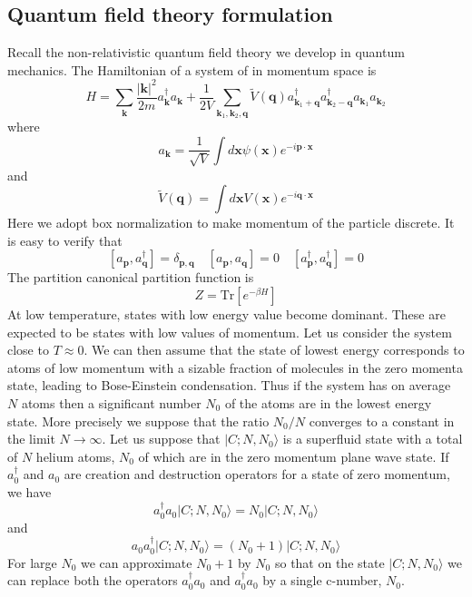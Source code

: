 \subsection{Quantum field theory formulation}
Recall the non-relativistic quantum field theory we develop in quantum mechanics.
The Hamiltonian of a system of  in momentum space is
\[H = \sum_{\bm{k}} \frac{|\bm{k}|^2}{2m} a_{\bm{k}}^{\dagger} a_{\bm{k}} + \frac{1}{2V} \sum_{\bm{k}_1,\bm{k}_2,\bm{q}} \tilde{V}(\bm{q}) a^{\dagger}_{\bm{k}_1 + \bm{q}} a^{\dagger}_{\bm{k}_2-\bm{q}} a_{\bm{k}_1} a_{\bm{k}_2}\]
where
\[a_{\bm{k}} = \frac{1}{\sqrt{V}} \int d\bm{x}\psi(\bm{x}) e^{-i\bm{p}\cdot\bm{x}}\]
and
\[\tilde{V}(\bm{q}) = \int d\bm{x} V(\bm{x}) e^{-i\bm{q}\cdot\bm{x}}\]
Here we adopt box normalization to make momentum of the particle discrete. It is easy to verify that
\[[a_{\bm{p}},a_{\bm{q}}^{\dagger}] = \delta_{\bm{p},\bm{q}} \quad [a_{\bm{p}},a_{\bm{q}}] = 0 \quad [a^{\dagger}_{\bm{p}},a^{\dagger}_{\bm{q}}] = 0\]
The partition canonical partition function is
\[Z = \mathrm{Tr}[e^{-\beta H}]\]
At low temperature, states with low energy value become dominant. These are expected to be states with low values of momentum. 
Let us consider the system close to $T \approx 0$. 
We can then assume that the state of lowest energy corresponds to atoms of low momentum with a sizable fraction of molecules in the zero momenta state, leading to Bose-Einstein condensation. 
Thus if the system has on average $N$ atoms then a significant number $N_0$ of the atoms are in the lowest energy state. More precisely we suppose that the ratio $N_0 / N$ converges to a constant in the limit $N \to \infty$. 
Let us suppose that $|C;N,N_0\rangle$ is a superfluid state with a total of $N$ helium atoms, $N_0$ of which are in the zero momentum plane wave state. 
If $a_0^{\dagger}$ and $a_0$ are creation and destruction operators for a state of zero momentum, we have
\[a_0^{\dagger}a_0 |C;N,N_0\rangle = N_0 |C;N,N_0\rangle\]
and
\[a_0a_0^{\dagger} |C;N,N_0\rangle = (N_0+1) |C;N,N_0\rangle\]
For large $N_0$ we can approximate $N_0 + 1$ by $N_0$ so that on the state $|C;N,N_0\rangle$ we can replace both the operators $a_0^{\dagger}a_0$ and $a_0^{\dagger}a_0$ by a single c-number, $N_0$.


